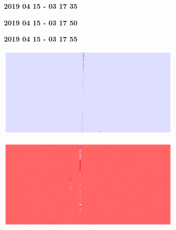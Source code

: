 \begin{figure}[!h]
    \centering    
    \begin{subfigure}{0.33\textwidth}
        \centering
        \textbf{2019 04 15 - 03 17 35}
    \end{subfigure}%
    \hfill
    \begin{subfigure}{0.33\textwidth}
        \centering
        \textbf{2019 04 15 - 03 17 50}
    \end{subfigure}%
    \hfill
    \begin{subfigure}{0.33\textwidth}
        \centering
        \textbf{2019 04 15 - 03 17 55}
    \end{subfigure}
    
    \vspace{1em}
    
    \begin{subfigure}{0.33\textwidth}
        \includegraphics[width=\textwidth]{figures/anomalies/before/20190415_031735.png}
    \end{subfigure}%
    \hfill
    \begin{subfigure}{0.33\textwidth}
        \includegraphics[width=\textwidth]{figures/anomalies/before/20190415_031750.png}
    \end{subfigure}%

\end{figure}
